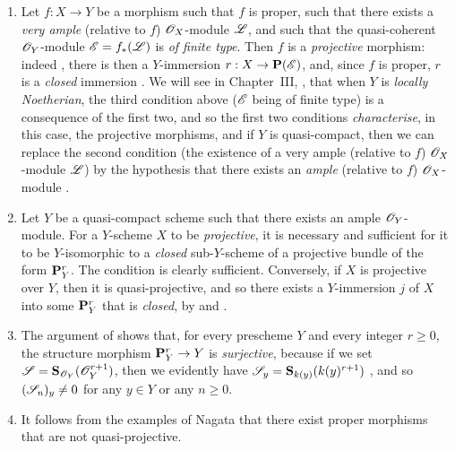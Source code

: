 \begin{rmk}[5.5.4]
\label{2.5.5.4}
\medskip\noindent
\begin{enumerate}[label=\emph{(\roman*)}]
  \item Let $f:X\to Y$ be a morphism such that $f$ is proper, such that there exists a \emph{very ample} (relative to $f$) $\mathscr{O}_X$-module $\mathscr{L}$, and such that the quasi-coherent $\mathscr{O}_Y$-module $\mathscr{E}=f_*(\mathscr{L})$ is \emph{of finite type}.
    Then $f$ is a \emph{projective} morphism: indeed , there is then a $Y$-immersion $r:X\to\bb{P}(\sh{E})$, and, since $f$ is proper, $r$ is a \emph{closed} immersion .
    We will see in Chapter~III, , that when $Y$ is \emph{locally Noetherian}, the third condition above ($\mathscr{E}$ being of finite type) is a consequence of the first two, and so the first two conditions \emph{characterise}, in this case, the projective morphisms, and if $Y$ is quasi-compact, then we can replace the second condition (the existence of a very ample (relative to $f$) $\mathscr{O}_X$-module $\mathscr{L}$) by the hypothesis that there exists an \emph{ample} (relative to $f$) $\mathscr{O}_X$-module .
  \item Let $Y$ be a quasi-compact scheme such that there exists an ample $\mathscr{O}_Y$-module.
    For a $Y$-scheme $X$ to be \emph{projective}, it is necessary and sufficient for it to be $Y$-isomorphic to a \emph{closed} sub-$Y$-scheme of a projective bundle of the form $\mathbf{P}_Y^r$.
    The condition is clearly sufficient.
    Conversely, if $X$ is projective over $Y$, then it is quasi-projective, and so there exists a $Y$-immersion $j$ of $X$ into some $\mathbf{P}_Y^r$  that is \emph{closed}, by  and .
  \item The argument of  shows that, for every prescheme $Y$ and every integer $r\geq0$, the structure morphism $\bb{P}_Y^r\to Y$ is \emph{surjective}, because if we set $\mathscr{S}=\mathbf{S}_{\mathscr{O}_Y}(\mathscr{O}_Y^{r+1})$, then we evidently have $\mathscr{S}_y=\mathbf{S}_{k(y)}(k(y)^{r+1})$ , and so $(\mathscr{S}_n)_y\neq0$ for any $y\in Y$ or any $n\geq0$.
  \item It follows from the examples of Nagata \cite{II-26} that there exist proper morphisms that are not quasi-projective.
\end{enumerate}
\end{rmk}

